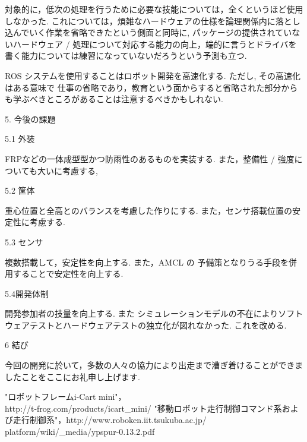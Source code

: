 \documentclass[twocolumn,10pt,a4paper]{jsarticle}
\begin{document}
対象的に，低次の処理を行うために必要な技能については，全くというほど使用しなかった.  これについては，煩雑なハードウェアの仕様を論理関係内に落とし込んでいく作業を省略できたという側面と同時に,
パッケージの提供されていないハードウェア / 処理について対応する能力の向上，端的に言うとドライバを書く能力については練習になっていないだろうという予測も立つ.

ROS システムを使用することはロボット開発を高速化する. ただし,
その高速化はある意味で 仕事の省略であり，教育という面からすると省略された部分からも学ぶべきところがあることは注意するべきかもしれない.

5. 今後の課題

 5.1 外装

FRPなどの一体成型型かつ防雨性のあるものを実装する. また，整備性 / 強度についても大いに考慮する,

 5.2 筐体

 重心位置と全高とのバランスを考慮した作りにする. また，センサ搭載位置の安定性に考慮する.

 5.3 センサ

複数搭載して，安定性を向上する. また，AMCL の 予備策となりうる手段を併用することで安定性を向上する.

 5.4開発体制

開発参加者の技量を向上する. また シミュレーションモデルの不在によりソフトウェアテストとハードウェアテストの独立化が図れなかった. これを改める.

6 結び

今回の開発に於いて，多数の人々の協力により出走まで漕ぎ着けることができましたことをここにお礼申し上げます.


\begin{thebibliography}{9}
   "ロボットフレームi-Cart mini"，\\ http://t-frog.com/products/icart\_mini/
   "移動ロボット走行制御コマンド系および走行制御系"，http://www.roboken.iit.tsukuba.ac.jp/\\platform/wiki/\_media/ypspur-0.13.2.pdf
\end{thebibliography}
\end{document}
